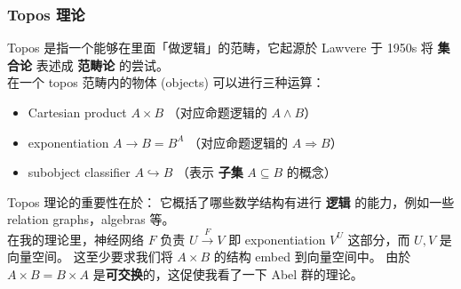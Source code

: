 \documentclass[15pt]{beamer}
\newcommand{\cc}[2]{#1}
\newcommand{\cc}[2]{#2}
\newcommand{\emp}[1]{{\color{violet}#1}}
\newcommand{\red}[1]{{\color{red}#1}}
\begin{document}
\begin{frame}
\frametitle{\cc{Topos 理论}{Topos theory}}

\cc{
Topos 是指一个能够在里面「\red{做逻辑}」的范畴，它起源於 Lawvere 于 1950s 将 \textbf{集合论} 表述成 \textbf{范畴论} 的尝试。 \\}{
A topos is a category in which one can ``do logic''.  The idea originated in 1950's when Lawvere tried to re-formulate the foundation of mathematics / set theory in the new language of category theory. \\
}
\cc{
在一个 topos 范畴内的物体 (objects) 可以进行三种运算：}{
In a topos, 3 operations are allowed between objects:
}
\begin{itemize}
	\item Cartesian product $A \times B$ \cc{
	（对应命题逻辑的 $A \wedge B$）}{
	(corresponding to $A \wedge B$ in propositional logic)
	}
	\item exponentiation $A \rightarrow B = B^A$ \cc{
	 （对应命题逻辑的 $A \Rightarrow B$）}{
	(corresponding to $A \Rightarrow B$ in propositional logic)
	}
	\item subobject classifier $A \hookrightarrow B$  \cc{
	（表示 \textbf{子集} $A \subseteq B$ 的概念）}{
	(corresponding to the subset notion $A \subseteq B$)
	}
\end{itemize}
\cc{
Topos 理论的重要性在於： 它概括了哪些数学结构有进行 \textbf{逻辑} 的能力，例如一些 relation graphs，algebras 等。 \\}{
The significance of topos theory is that it distills which mathematical structures are able to carry on \emp{logic} operations, e.g. relation graphs, algebras, etc. \\
}
\cc{
在我的理论里，神经网络 $F$ 负责 $U \stackrel{F}{\rightarrow} V$ 即 exponentiation $V^U$ 这部分，而 $U, V$ 是向量空间。 这至少要求我们将 $A \times B$ 的结构 embed 到向量空间中。 由於 $A \times B = B \times A$ 是\textbf{可交换}的，这促使我看了一下 Abel 群的理论。}{
In my theory, the neural network $F$ implements $U \stackrel{F}{\rightarrow} V$ which is the exponentiation $V^U$, where $U, V$ are vector spaces.  This requires, at least, to embed the structure of $A \times B$ into vector space.  However $A \times B = B \times A$ is \emp{commutative}, which leads me to consider Abelian group theory....
}
\end{frame}
\end{document}
